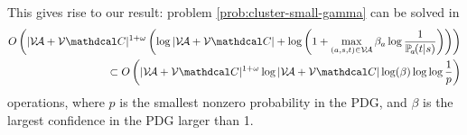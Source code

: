\documentclass{article}
\begin{document}
\begin{lproof}
    This gives rise to our result: problem \eqref{prob:cluster-small-gamma} can be solved in 
    \begin{align*}
        O\left( |\V \!\Ar + \V \mathdcal C|^{1+\omega} 
            \left(\log |\V \!\Ar + \V \mathdcal C| + \log\left(1 + \max_{(a,s,t) \in \V\!\Ar} \beta_a \log \frac{1}{\p_a(t|s)} \right) \right)  \right) \\
        \subset 
        O\left( |\V \!\Ar + \V \mathdcal C|^{1+ \omega} 
            \log |\V \!\Ar + \V \mathdcal C|
            \log (\beta ) \log\log \frac{1}{p} \right)
    \end{align*}
    operations, where $p$ is the smallest nonzero probability in the PDG, and $\beta$ is the largest confidence in the PDG larger than 1.
\end{lproof}
\end{document}
